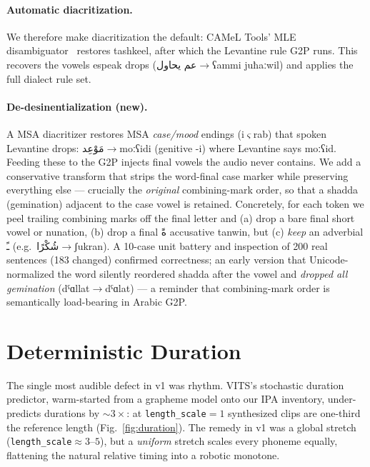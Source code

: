 \documentclass[10pt,twocolumn]{article}
\newcommand{\ipa}[1]{{\ipafont #1}}
\newcommand{\ar}[1]{{\arabicfont #1}}
\begin{document}
\paragraph{Automatic diacritization.} We therefore make diacritization the default: CAMeL
Tools' MLE disambiguator~\cite{cameltools} restores tashkeel, after which the Levantine rule
G2P runs. This recovers the vowels espeak drops
(\ar{عم يحاول}\(\rightarrow\)\ipa{ʕammi juħaːwil}) and applies the full dialect rule set.

\paragraph{De-desinentialization (new).} A MSA diacritizer restores MSA \emph{case/mood}
endings (i\(\varsigma\)rab) that spoken Levantine drops:
\ar{مَوْعِد}\(\rightarrow\)\ipa{moːʕidi} (genitive \ipa{-i}) where Levantine says
\ipa{moːʕid}. Feeding these to the G2P injects final vowels the audio never contains. We add
a conservative transform that strips the word-final case marker while preserving everything
else --- crucially the \emph{original} combining-mark order, so that a shadda (gemination)
adjacent to the case vowel is retained. Concretely, for each token we peel trailing combining
marks off the final letter and (a) drop a bare final short vowel or nunation, (b) drop a final
\ar{ةً} accusative tanwin, but (c) \emph{keep} an adverbial \ar{ـً} (e.g.\
\ar{شُكْرًا}\(\rightarrow\)\ipa{ʃukran}). A 10-case unit battery and inspection of 200 real
sentences (183 changed) confirmed correctness; an early version that Unicode-normalized the
word silently reordered shadda after the vowel and \emph{dropped all gemination}
(\ipa{dˤɑllat}\(\rightarrow\)\ipa{dˤɑlat}) --- a reminder that combining-mark order is
semantically load-bearing in Arabic G2P.

\section{Deterministic Duration}
\label{sec:duration}
The single most audible defect in v1 was rhythm. VITS's stochastic duration predictor,
warm-started from a grapheme model onto our IPA inventory, under-predicts durations by
\(\sim\!3\times\): at \texttt{length\_scale}\(=\!1\) synthesized clips are one-third the
reference length (Fig.~\ref{fig:duration}). The remedy in v1 was a global stretch
(\texttt{length\_scale}\(\approx\!3\text{--}5\)), but a \emph{uniform} stretch scales every
phoneme equally, flattening the natural relative timing into a robotic monotone.
\end{document}
